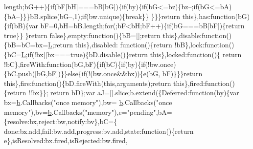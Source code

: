 \begin{DoxyCode}
      length;bG++)\{\textcolor{keywordflow}{if}(bF[bH]===bB[bG])\{\textcolor{keywordflow}{if}(by)\{\textcolor{keywordflow}{if}(bG<=bz)\{bz--;\textcolor{keywordflow}{if}(bG<=bA)\{bA--\}\}\}bB.splice(bG--,1);\textcolor{keywordflow}{if}(bw.unique)\{\textcolor{keywordflow}{break}\}\}
      \}\}\}\textcolor{keywordflow}{return} \textcolor{keyword}{this}\},has:\textcolor{keyword}{function}(bG)\{\textcolor{keywordflow}{if}(bB)\{var bF=0,bH=bB.length;\textcolor{keywordflow}{for}(;bF<bH;bF++)\{\textcolor{keywordflow}{if}(bG===bB[bF])\{\textcolor{keywordflow}{return} \textcolor{keyword}{true}\}\}
      \}\textcolor{keywordflow}{return} \textcolor{keyword}{false}\},empty:\textcolor{keyword}{function}()\{bB=[];\textcolor{keywordflow}{return} \textcolor{keyword}{this}\},disable:\textcolor{keyword}{function}()\{bB=bC=bx=\hyperlink{a00039_a38ee4c0b5f4fe2a18d0c783af540d253}{L};\textcolor{keywordflow}{return} \textcolor{keyword}{this}\},disabled:\textcolor{keyword}{
      function}()\{\textcolor{keywordflow}{return} !bB\},lock:\textcolor{keyword}{function}()\{bC=\hyperlink{a00039_a38ee4c0b5f4fe2a18d0c783af540d253}{L};\textcolor{keywordflow}{if}(!bx||bx===\textcolor{keyword}{true})\{bD.disable()\}\textcolor{keywordflow}{return} \textcolor{keyword}{this}\},locked:\textcolor{keyword}{function}()\{\textcolor{keywordflow}{
      return} !bC\},fireWith:\textcolor{keyword}{function}(bG,bF)\{\textcolor{keywordflow}{if}(bC)\{\textcolor{keywordflow}{if}(by)\{\textcolor{keywordflow}{if}(!bw.once)\{bC.push([bG,bF])\}\}\textcolor{keywordflow}{else}\{\textcolor{keywordflow}{if}(!(bw.once&&bx))\{e(bG,
      bF)\}\}\}\textcolor{keywordflow}{return} \textcolor{keyword}{this}\},fire:\textcolor{keyword}{function}()\{bD.fireWith(\textcolor{keyword}{this},arguments);\textcolor{keywordflow}{return} \textcolor{keyword}{this}\},fired:\textcolor{keyword}{function}()\{\textcolor{keywordflow}{return} !!bx\}\};\textcolor{keywordflow}{
      return} bD\};var aJ=[].slice;\hyperlink{a00039_aa4026ad5544b958e54ce5e106fa1c805}{b}.extend(\{Deferred:\textcolor{keyword}{function}(by)\{var bx=\hyperlink{a00039_aa4026ad5544b958e54ce5e106fa1c805}{b}.Callbacks(\textcolor{stringliteral}{"once memory"}),bw=
      \hyperlink{a00039_aa4026ad5544b958e54ce5e106fa1c805}{b}.Callbacks(\textcolor{stringliteral}{"once memory"}),bv=\hyperlink{a00039_aa4026ad5544b958e54ce5e106fa1c805}{b}.Callbacks(\textcolor{stringliteral}{"memory"}),e=\textcolor{stringliteral}{"pending"},bA=\{resolve:bx,reject:bw,notify:bv\},bC=\{
      done:bx.add,fail:bw.add,progress:bv.add,state:\textcolor{keyword}{function}()\{\textcolor{keywordflow}{return} e\},isResolved:bx.fired,isRejected:bw.fired,

\end{DoxyCode}
